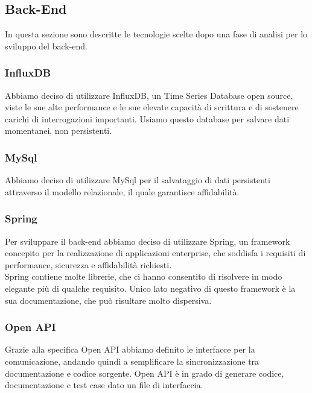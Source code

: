 \documentclass[../manuale-sviluppatore.tex]{subfiles}
\begin{document}
\subsection{Back-End}%
\label{sub:back-end}
In questa sezione sono descritte le tecnologie scelte dopo una fase di analisi per lo sviluppo del back-end.

\subsubsection{InfluxDB}%
\label{sub:influxDB}
Abbiamo deciso di utilizzare InfluxDB, un Time Series Database open source, viste le sue alte performance e le sue elevate capacità di scrittura e di sostenere carichi di interrogazioni 
importanti. Usiamo questo database per salvare dati momentanei, non persistenti.

\subsubsection{MySql}%
\label{sub:mysql}
Abbiamo deciso di utilizzare MySql per il salvataggio di dati persistenti attraverso il modello relazionale, il quale garantisce affidabilità.

\subsubsection{Spring}%
\label{sub:spring}
Per sviluppare il back-end abbiamo deciso di utilizzare Spring, un framework concepito per la realizzazione di applicazioni enterprise, che soddisfa i requisiti
di performance, sicurezza e affidabilità richiesti. \\
Spring contiene molte librerie, che ci hanno consentito di risolvere in modo elegante più di qualche requisito.
Unico lato negativo di questo framework è la sua documentazione, che può risultare molto dispersiva.

\subsubsection{Open API}%
\label{sub:open_api}
Grazie alla specifica Open API abbiamo definito le interfacce per la comunicazione, andando quindi a semplificare la sincronizzazione tra documentazione e codice sorgente.
Open API è in grado di generare codice, documentazione e test case dato un file di interfaccia.
\end{document}
